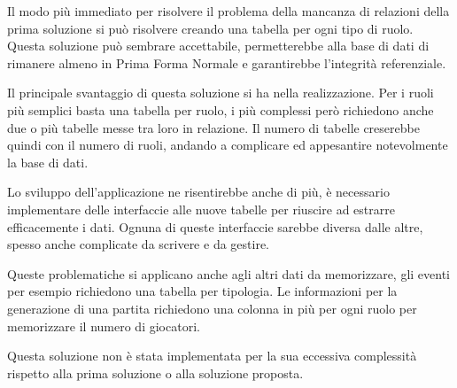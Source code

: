 Il modo più immediato per risolvere il problema della mancanza di relazioni della prima soluzione si può risolvere creando una tabella per ogni tipo di ruolo. Questa soluzione può sembrare accettabile, permetterebbe alla base di dati di rimanere almeno in Prima Forma Normale e garantirebbe l'integrità referenziale.

Il principale svantaggio di questa soluzione si ha nella realizzazione. Per i ruoli più semplici basta una tabella per ruolo, i più complessi però richiedono anche due o più tabelle messe tra loro in relazione. Il numero di tabelle creserebbe quindi con il numero di ruoli, andando a complicare ed appesantire notevolmente la base di dati.

Lo sviluppo dell'applicazione ne risentirebbe anche di più, è necessario implementare delle interfaccie alle nuove tabelle per riuscire ad estrarre efficacemente i dati. Ognuna di queste interfaccie sarebbe diversa dalle altre, spesso anche complicate da scrivere e da gestire. 

Queste problematiche si applicano anche agli altri dati da memorizzare, gli eventi per esempio richiedono una tabella per tipologia. Le informazioni per la generazione di una partita richiedono una colonna in più per ogni ruolo per memorizzare il numero di giocatori. 

Questa soluzione non è stata implementata per la sua eccessiva complessità rispetto alla prima soluzione o alla soluzione proposta.